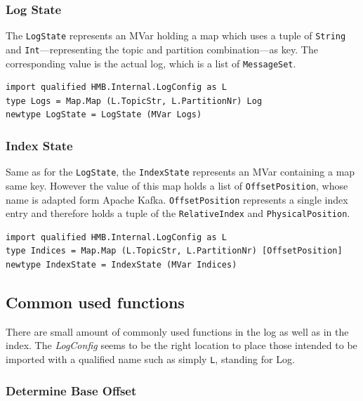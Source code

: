 \newpage
\subsubsection{Log State}

The \lstinline{LogState} represents an MVar holding a map which uses a tuple of
\lstinline{String} and \lstinline{Int}---representing the topic and partition
 combination---as key. The corresponding value is the actual log, which is a list
of \lstinline{MessageSet}.

\begin{lstlisting}
import qualified HMB.Internal.LogConfig as L
type Logs = Map.Map (L.TopicStr, L.PartitionNr) Log
newtype LogState = LogState (MVar Logs)
\end{lstlisting}

\subsubsection{Index State}

Same as for the \lstinline{LogState}, the \lstinline{IndexState} represents an
MVar containing a map same key. However the value
of this map holds a list of \lstinline{OffsetPosition}, whose name is
adapted form Apache Kafka. \lstinline{OffsetPosition} represents a single index
entry and therefore holds a tuple of the \lstinline{RelativeIndex} and
\lstinline{PhysicalPosition}. 

\begin{lstlisting}
import qualified HMB.Internal.LogConfig as L
type Indices = Map.Map (L.TopicStr, L.PartitionNr) [OffsetPosition]
newtype IndexState = IndexState (MVar Indices)
\end{lstlisting}

\subsection{Common used functions}

There are small amount of commonly used functions in the log as well as in the
index. The \textit{LogConfig} seems to be the right location to place those
intended to be imported with a qualified name such as simply \lstinline{L},
standing for Log.

\subsubsection{Determine Base Offset}
\label{subsubsec:broker-log-general-baseoffset}

